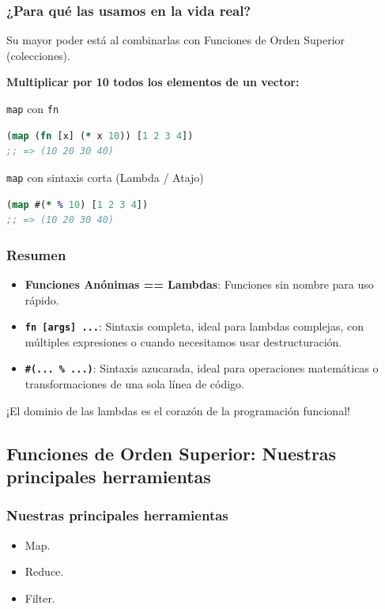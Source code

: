 \documentclass{beamer}
\begin{document}
\begin{frame}[fragile]
\frametitle{¿Para qué las usamos en la vida real?}
Su mayor poder está al combinarlas con Funciones de Orden Superior (colecciones).

\vspace{0.5cm}
\textbf{Multiplicar por 10 todos los elementos de un vector:}
\begin{block}{\texttt{map} con \texttt{fn}}
\begin{lstlisting}[language=Clojure]
(map (fn [x] (* x 10)) [1 2 3 4])
;; => (10 20 30 40)    
\end{lstlisting}
\end{block}

\begin{block}{\texttt{map} con sintaxis corta (Lambda / Atajo)}
\begin{lstlisting}[language=Clojure]
(map #(* % 10) [1 2 3 4])
;; => (10 20 30 40)
\end{lstlisting}
\end{block}
\end{frame}

\begin{frame}
\frametitle{Resumen}
\begin{itemize}
    \item \textbf{Funciones Anónimas == Lambdas}: Funciones sin nombre para uso rápido.
    \item \textbf{\texttt{fn [args] ...}}: Sintaxis completa, ideal para lambdas complejas, con múltiples expresiones o cuando necesitamos usar destructuración.
    \item \textbf{\texttt{\#(... \% ...)}}: Sintaxis azucarada, ideal para operaciones matemáticas o transformaciones de una sola línea de código.
\end{itemize}
\vspace{1cm}
\begin{center}
    \Large ¡El dominio de las lambdas es el corazón de la programación funcional!
\end{center}
\end{frame}

\subsection{Funciones de Orden Superior: Nuestras principales herramientas}

\begin{frame}[fragile]
    \frametitle{Nuestras principales herramientas}
    \begin{itemize}
        \item Map.
        \item Reduce.
        \item Filter.
    \end{itemize}
    
\end{frame}
\end{document}
